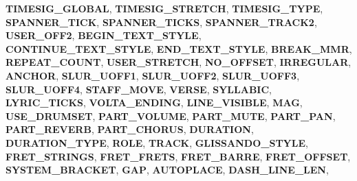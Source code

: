 \begin{DoxyCompactItemize}
{\bfseries T\+I\+M\+E\+S\+I\+G\+\_\+\+G\+L\+O\+B\+AL}, 
{\bfseries T\+I\+M\+E\+S\+I\+G\+\_\+\+S\+T\+R\+E\+T\+CH}, 
{\bfseries T\+I\+M\+E\+S\+I\+G\+\_\+\+T\+Y\+PE}, 
{\bfseries S\+P\+A\+N\+N\+E\+R\+\_\+\+T\+I\+CK}, 
\newline
{\bfseries S\+P\+A\+N\+N\+E\+R\+\_\+\+T\+I\+C\+KS}, 
{\bfseries S\+P\+A\+N\+N\+E\+R\+\_\+\+T\+R\+A\+C\+K2}, 
{\bfseries U\+S\+E\+R\+\_\+\+O\+F\+F2}, 
{\bfseries B\+E\+G\+I\+N\+\_\+\+T\+E\+X\+T\+\_\+\+S\+T\+Y\+LE}, 
\newline
{\bfseries C\+O\+N\+T\+I\+N\+U\+E\+\_\+\+T\+E\+X\+T\+\_\+\+S\+T\+Y\+LE}, 
{\bfseries E\+N\+D\+\_\+\+T\+E\+X\+T\+\_\+\+S\+T\+Y\+LE}, 
{\bfseries B\+R\+E\+A\+K\+\_\+\+M\+MR}, 
{\bfseries R\+E\+P\+E\+A\+T\+\_\+\+C\+O\+U\+NT}, 
\newline
{\bfseries U\+S\+E\+R\+\_\+\+S\+T\+R\+E\+T\+CH}, 
{\bfseries N\+O\+\_\+\+O\+F\+F\+S\+ET}, 
{\bfseries I\+R\+R\+E\+G\+U\+L\+AR}, 
{\bfseries A\+N\+C\+H\+OR}, 
\newline
{\bfseries S\+L\+U\+R\+\_\+\+U\+O\+F\+F1}, 
{\bfseries S\+L\+U\+R\+\_\+\+U\+O\+F\+F2}, 
{\bfseries S\+L\+U\+R\+\_\+\+U\+O\+F\+F3}, 
{\bfseries S\+L\+U\+R\+\_\+\+U\+O\+F\+F4}, 
\newline
{\bfseries S\+T\+A\+F\+F\+\_\+\+M\+O\+VE}, 
{\bfseries V\+E\+R\+SE}, 
{\bfseries S\+Y\+L\+L\+A\+B\+IC}, 
{\bfseries L\+Y\+R\+I\+C\+\_\+\+T\+I\+C\+KS}, 
\newline
{\bfseries V\+O\+L\+T\+A\+\_\+\+E\+N\+D\+I\+NG}, 
{\bfseries L\+I\+N\+E\+\_\+\+V\+I\+S\+I\+B\+LE}, 
{\bfseries M\+AG}, 
{\bfseries U\+S\+E\+\_\+\+D\+R\+U\+M\+S\+ET}, 
\newline
{\bfseries P\+A\+R\+T\+\_\+\+V\+O\+L\+U\+ME}, 
{\bfseries P\+A\+R\+T\+\_\+\+M\+U\+TE}, 
{\bfseries P\+A\+R\+T\+\_\+\+P\+AN}, 
{\bfseries P\+A\+R\+T\+\_\+\+R\+E\+V\+E\+RB}, 
\newline
{\bfseries P\+A\+R\+T\+\_\+\+C\+H\+O\+R\+US}, 
{\bfseries D\+U\+R\+A\+T\+I\+ON}, 
{\bfseries D\+U\+R\+A\+T\+I\+O\+N\+\_\+\+T\+Y\+PE}, 
{\bfseries R\+O\+LE}, 
\newline
{\bfseries T\+R\+A\+CK}, 
{\bfseries G\+L\+I\+S\+S\+A\+N\+D\+O\+\_\+\+S\+T\+Y\+LE}, 
{\bfseries F\+R\+E\+T\+\_\+\+S\+T\+R\+I\+N\+GS}, 
{\bfseries F\+R\+E\+T\+\_\+\+F\+R\+E\+TS}, 
\newline
{\bfseries F\+R\+E\+T\+\_\+\+B\+A\+R\+RE}, 
{\bfseries F\+R\+E\+T\+\_\+\+O\+F\+F\+S\+ET}, 
{\bfseries S\+Y\+S\+T\+E\+M\+\_\+\+B\+R\+A\+C\+K\+ET}, 
{\bfseries G\+AP}, 
\newline
{\bfseries A\+U\+T\+O\+P\+L\+A\+CE}, 
{\bfseries D\+A\+S\+H\+\_\+\+L\+I\+N\+E\+\_\+\+L\+EN}, 

\end{DoxyCompactItemize}
